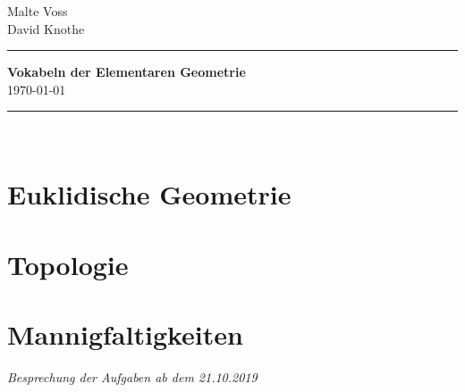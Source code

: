 \documentclass[a4paper,11pt]{article} %
\theoremstyle{definition} %
\begin{document}
%
\hfill \parbox{24mm}
{ 
Malte Voss\\
David Knothe\\
}

\rule{\textwidth}{1pt}                                   %
%
\begin{center}
\textbf{
Vokabeln der Elementaren Geometrie \\[1ex] %
}
{
%
%
\today
}
\end{center}
% 
\rule{\textwidth}{1pt}\\                                 %
\section{Euklidische Geometrie} 

\vspace{3ex}
\section{Topologie}

\vspace{3ex}
\section{Mannigfaltigkeiten}




\vspace*{\fill} %

\begin{flushright}
\textit{ Besprechung der Aufgaben ab dem 21.10.2019 }
\end{flushright}
\end{document}
